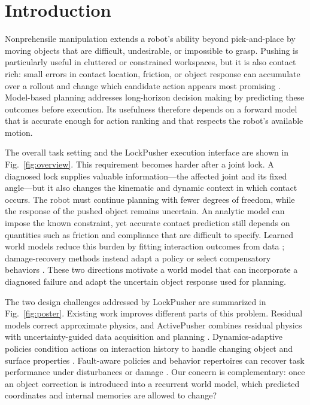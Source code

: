 \documentclass[conference]{IEEEtran}
\begin{document}
\section{Introduction}
Nonprehensile manipulation extends a robot's ability beyond pick-and-place by moving objects that are difficult, undesirable, or impossible to grasp. Pushing is particularly useful in cluttered or constrained workspaces, but it is also contact rich: small errors in contact location, friction, or object response can accumulate over a rollout and change which candidate action appears most promising \cite{finn2017visual,bauza2018data}. Model-based planning addresses long-horizon decision making by predicting these outcomes before execution. Its usefulness therefore depends on a forward model that is accurate enough for action ranking and that respects the robot's available motion.

The overall task setting and the LockPusher execution interface are shown in Fig.~\ref{fig:overview}. This requirement becomes harder after a joint lock. A diagnosed lock supplies valuable information---the affected joint and its fixed angle---but it also changes the kinematic and dynamic context in which contact occurs. The robot must continue planning with fewer degrees of freedom, while the response of the pushed object remains uncertain. An analytic model can impose the known constraint, yet accurate contact prediction still depends on quantities such as friction and compliance that are difficult to specify. Learned world models reduce this burden by fitting interaction outcomes from data \cite{bauza2018data,kim2023se2}; damage-recovery methods instead adapt a policy or select compensatory behaviors \cite{cully2015robots,yang2021fault}. These two directions motivate a world model that can incorporate a diagnosed failure and adapt the uncertain object response used for planning.

The two design challenges addressed by LockPusher are summarized in Fig.~\ref{fig:poster}. Existing work improves different parts of this problem. Residual models correct approximate physics, and ActivePusher combines residual physics with uncertainty-guided data acquisition and planning \cite{zhong2026activepusher}. Dynamics-adaptive policies condition actions on interaction history to handle changing object and surface properties \cite{lyu2025dywa}. Fault-aware policies and behavior repertoires can recover task performance under disturbances or damage \cite{cully2015robots,yang2021fault}. Our concern is complementary: once an object correction is introduced into a recurrent world model, which predicted coordinates and internal memories are allowed to change?
\end{document}

